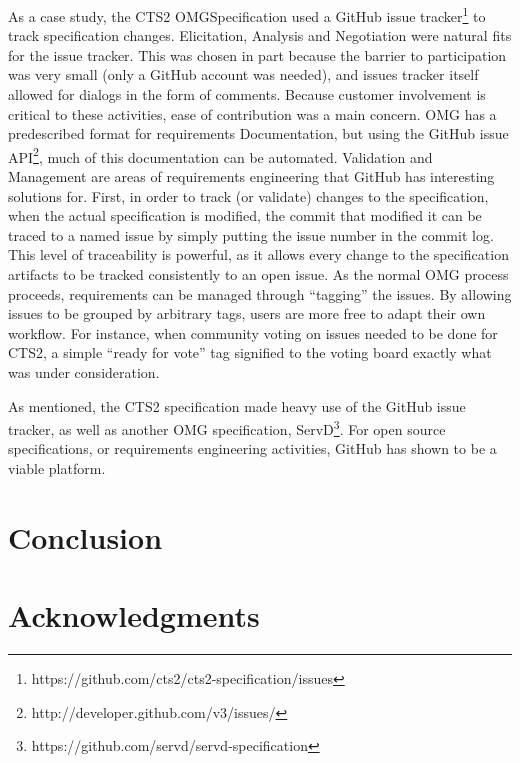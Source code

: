 \documentclass{proc}
\begin{document}
As a case study, the CTS2 OMG\textregistered Specification\cite{cts2} used a GitHub issue tracker\footnote{https://github.com/cts2/cts2-specification/issues} to track specification changes. Elicitation, Analysis and Negotiation were natural fits for the issue tracker. This was chosen in part because the barrier to participation was very small (only a GitHub account was needed), and issues tracker itself allowed for dialogs in the form of comments. Because customer involvement is critical to these activities\cite{paetsch2003requirements}, ease of contribution was a main concern. OMG has a predescribed format for requirements Documentation, but using the GitHub issue API\footnote{http://developer.github.com/v3/issues/}, much of this documentation can be automated.
Validation and Management are areas of requirements engineering that GitHub has interesting solutions for. First, in order to track (or validate) changes to the specification, when the actual specification is modified, the commit that modified it can be traced to a named issue by simply putting the issue number in the commit log. This level of traceability is powerful, as it allows every change to the specification artifacts to be tracked consistently to an open issue. As the normal OMG process proceeds, requirements can be managed through ``tagging'' the issues. By allowing issues to be grouped by arbitrary tags, users are more free to adapt their own workflow. For instance, when community voting on issues needed to be done for CTS2, a simple ``ready for vote'' tag signified to the voting board exactly what was under consideration.

As mentioned, the CTS2 specification made heavy use of the GitHub issue tracker, as well as another OMG specification, ServD\footnote{https://github.com/servd/servd-specification}. For open source specifications, or requirements engineering activities, GitHub has shown to be a viable platform. 

\section{Conclusion}

\section{Acknowledgments}



\end{document}
